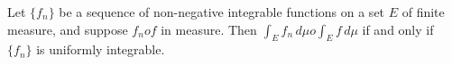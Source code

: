 Let $\{f_n\}$ be a sequence of non-negative integrable functions on a set $E$ of finite measure, and suppose $f_n 	o f$ in measure. Then $\int_E f_n \, d\mu 	o \int_E f \, d\mu$ if and only if $\{f_n\}$ is uniformly integrable.
